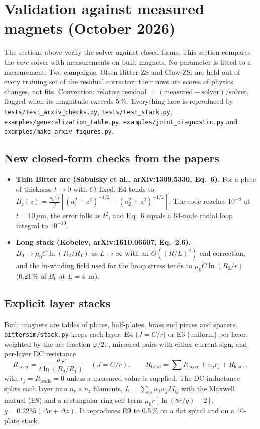 \section{Validation against measured magnets (October 2026)}
\label{sec:measured}

The sections above verify the solver against closed forms.
This section compares the \emph{bare} solver with measurements on built magnets.
No parameter is fitted to a measurement.
Two campaigns, Olsen Bitter-ZS and Claw-ZS, are held out of every training set of the residual corrector; their rows are scores of physics changes, not fits.
Convention: relative residual $=(\text{measured}-\text{solver})/\text{solver}$, flagged when its magnitude exceeds 5\,\%.
Everything here is reproduced by \texttt{tests/test\_arxiv\_checks.py}, \texttt{tests/test\_stack.py}, \texttt{examples/generalization\_table.py}, \texttt{examples/joint\_diagnostic.py} and \texttt{examples/make\_arxiv\_figures.py}.

\subsection{New closed-form checks from the papers}
\begin{itemize}
\item \textbf{Thin Bitter arc (Sabulsky et al., arXiv:1309.5330, Eq.~6).} For a plate of thickness $t\to0$ with $Ct$ fixed, E4 tends to
$B_z(z)=\tfrac{\mu_0 Ct}{2}\left[(a_1^2+z^2)^{-1/2}-(a_2^2+z^2)^{-1/2}\right]$.
The code reaches $10^{-8}$ at $t=10\,\mu$m, the error falls as $t^2$, and Eq.~6 equals a 64-node radial loop integral to $10^{-10}$.
\item \textbf{Long stack (Kobelev, arXiv:1610.06607, Eq.~2.6).} $B_0\to\mu_0C\ln(R_2/R_1)$ as $L\to\infty$ with an $O((R/L)^2)$ end correction, and the in-winding field used for the hoop stress tends to $\mu_0C\ln(R_2/r)$ (0.21\,\% of $B_0$ at $L=4$~m).
\end{itemize}

\subsection{Explicit layer stacks}
Built magnets are tables of plates, half-plates, brass end pieces and spacers.
\texttt{bittersim/stack.py} keeps each layer: E4 ($J=C/r$) or E3 (uniform) per layer, weighted by the arc fraction $\varphi/2\pi$, mirrored pairs with either current sign, and per-layer DC resistance
\begin{equation}
R_{\text{layer}}=\frac{\rho\,\varphi}{t\ln(R_2/R_1)}\quad(J=C/r),\qquad
R_{\text{total}}=\sum R_{\text{layer}} + n_j r_j + R_{\text{leads}},
\end{equation}
with $r_j=R_{\text{leads}}=0$ unless a measured value is supplied.
The DC inductance splits each layer into $n_r\times n_z$ filaments, $L=\sum_{ij}w_iw_jM_{ij}$ with the Maxwell mutual (E8) and a rectangular-ring self term $\mu_0r[\ln(8r/g)-2]$, $g=0.2235(\Delta r+\Delta z)$.
It reproduces E9 to 0.5\,\% on a flat spiral and on a 40-plate stack.

